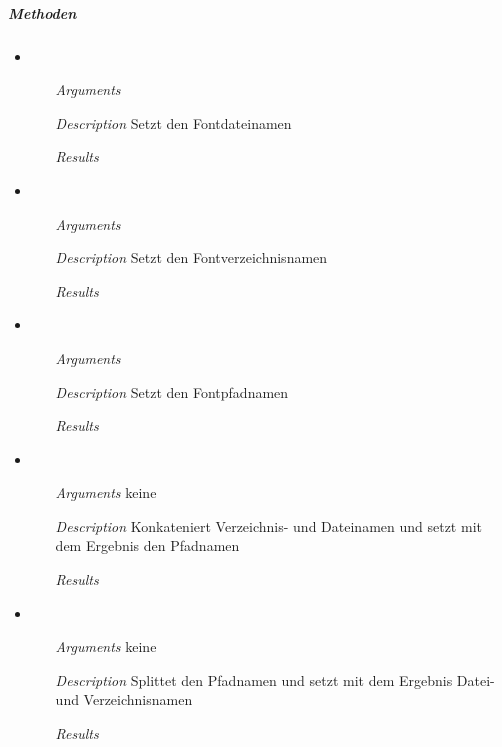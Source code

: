 \subparagraph{Methoden}
\begin{itemize}
\item {}
\begin{enumerate}
\item[\textit{Arguments}] 
\item[\textit{Description}] Setzt den Fontdateinamen
\item[\textit{Results}] 
\end{enumerate}

\item {}
\begin{enumerate}
\item[\textit{Arguments}] 
\item[\textit{Description}] Setzt den Fontverzeichnisnamen
\item[\textit{Results}] 
\end{enumerate}

\item {}
\begin{enumerate}
\item[\textit{Arguments}] 
\item[\textit{Description}] Setzt den Fontpfadnamen
\item[\textit{Results}] 
\end{enumerate}

\item {}
\begin{enumerate}
\item[\textit{Arguments}] keine
\item[\textit{Description}] Konkateniert Verzeichnis- und
Dateinamen und setzt mit dem Ergebnis den Pfadnamen
\item[\textit{Results}] 
\end{enumerate}

\item {}
\begin{enumerate}
\item[\textit{Arguments}] keine
\item[\textit{Description}] Splittet den Pfadnamen und
setzt mit dem Ergebnis Datei- und Verzeichnisnamen
\item[\textit{Results}] 
\end{enumerate}


\end{itemize}
